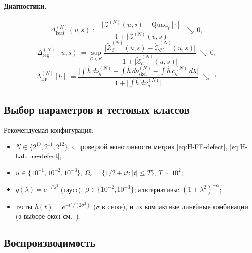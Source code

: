 \documentclass{article}
\numberwithin{equation}{section}
\theoremstyle{plain}
\theoremstyle{definition}
\theoremstyle{remark}
\def\alpha{α}\def\beta{β}\def\gamma{γ}\def\Gamma{Γ}%
\def\cdot{·}\def\times{×}\def\pm{±}\def\mp{∓}\def\approx{≈}%
\begin{document}
\paragraph{Диагностики.}
\begin{equation}\label{eq:H-diag1}
  \Delta_{\mathrm{heat}}^{(N)}(u,s):=
  \frac{\big|\mathcal Z^{(N)}(u,s) - \text{Quad}_t[\cdot]\big|}
  {1+\big|\mathcal Z^{(N)}(u,s)\big|} \ \searrow\ 0,
\end{equation}
\begin{equation}\label{eq:H-diag2}
  \Delta_{\mathrm{reg}}^{(N)}(u,s):=
  \sup_{\mathcal C\in\mathfrak C}\frac{\big|\widetilde{\mathcal Z}_{\mathcal C}^{(N)}(u,s)-\widetilde{\mathcal Z}_{\mathcal C'}^{(N)}(u,s)\big|}
  {1+\big|\widetilde{\mathcal Z}_{\mathcal C}^{(N)}(u,s)\big|} \ \searrow\ 0,
\end{equation}
\begin{equation}\label{eq:H-diag3}
  \Delta_{\mathrm{EF}}^{(N)}[h]:=
  \frac{\Big|\int \widehat h\,d\nu_g^{(N)} - \int \widehat h\,d\nu_{\mathrm{skel}}^{(N)} - \int \widehat h\,a_g^{(N)}\,d\lambda\Big|}
  {1+\big|\int \widehat h\,d\nu_g^{(N)}\big|} \ \searrow\ 0.
\end{equation}

\subsection*{Выбор параметров и тестовых классов}

Рекомендуемая конфигурация:
\begin{itemize}
  \item \(N\in\{2^{10},2^{11},2^{12}\}\), с проверкой монотонности метрик \eqref{eq:H-FE-defect}, \eqref{eq:H-balance-defect};
  \item \(u\in\{10^{-1},10^{-2},10^{-3}\}\), \(\Omega_s=\{1/2+it: |t|\le T\}\), \(T\sim 10^2\);
  \item \(g(\lambda)=e^{-\beta \lambda^2}\) (гаусс), \(\beta\in\{10^{-2},10^{-3}\}\); альтернативы: \((1+\lambda^2)^{-\alpha}\);
  \item тесты \(h(t)=e^{-t^2/(2\sigma^2)}\) (\(\sigma\) в сетке), и их компактные линейные комбинации (о выборе окон см.~\cite{Harris1978}).
\end{itemize}

\subsection*{Воспроизводимость}
\end{document}
